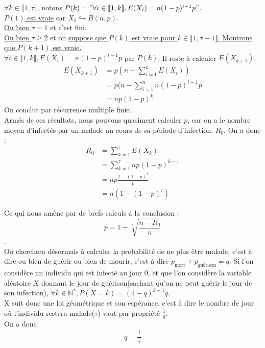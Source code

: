 \documentclass{article}
\begin{document}
	\underline{$\forall k \in \llbracket 1, \tau \rrbracket$, notons $P(k) = "\forall i \in \llbracket 1, k \rrbracket, E(X_i) = n(1-p)^{i-1}p"$}.\\[0.2cm]
	\underline{$P(1)$ est vraie} car $X_1 \hookrightarrow B(n, p)$.\\[0.2cm]
	\underline{Ou bien $\tau = 1$} et c'est fini.\\[0.2cm]
	\underline{Ou bien $\tau \ge 2$} et on \underline{suppose que $P(k)$ est vraie pour $k \in \llbracket 1, \tau - 1 \rrbracket$. Montrons que $P(k+1)$ est vraie.}\\[0.2cm]
	$\forall i \in \llbracket 1, k \rrbracket, E(X_i) = n(1-p)^{i-1}p$ par $P(k)$. Il reste à calculer $E(X_{k+1})$.\\
	\begin{align*}
		E(X_{k+1}) &= p(n - \sum_{i = 1}^n E(X_i)) \\
		           &= p(n - \sum_{i = 1}^n n(1-p)^{i - 1}p \\
		           &= np(1-p)^k
	\end{align*}
	On conclut par récurrence multiple finie.\\
	Armés de ces résultats, nous pouvons quasiment calculer $p$, car on a le nombre moyen d'infectés par un malade au cours de sa période d'infection, $R_0$. On a donc : \\ 
	\begin{align*}
		R_0 &= \sum_{k=1}^\tau E(X_k) \\
		    &= \sum_{k=1}^\tau np(1-p)^{k-1}\\
		    &= np\frac{1 - (1-p)^\tau}{p}\\
		    &= n(1 - (1-p)^\tau)
	\end{align*}
	
	Ce qui nous amène par de brefs calculs à la conclusion : \\
	$$p = 1 - \sqrt[\tau]{\frac{n - R_0}{n}}$$.\\
	
	On cherchera désormais à calculer la probabilité de ne plus être malade, c'est à dire ou bien de guérir ou bien de mourir, c'est à dire $p_{\text{mort}} + p_{\text{guérison}} = q$. Si l'on considère un individu qui est infecté au jour $0$, et que l'on considère la variable aléatoire $X$ donnant le jour de guérison(sachant qu'on ne peut guérir le jour de son infection), $\forall k \in \mathbb{N}^*, P(X=k) = (1-q)^{k-1}q$.\\
	X suit donc une loi géométrique et son espérance, c'est à dire le nombre de jour où l'individu restera malade($\tau$) vaut par propriété $\frac{1}{q}$.\\
	On a donc $$ q = \frac{1}{\tau}$$\\
	
\end{document}
